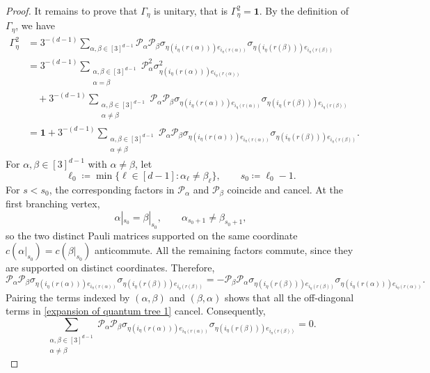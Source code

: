 \documentclass{amsbook}
\theoremstyle{definition}
\theoremstyle{remark}
\numberwithin{section}{chapter}
\numberwithin{equation}{chapter}
\newcommand{\1}{\mathbf{1}}
\begin{document}
\begin{proof}
It remains to prove that $\Gamma_{\eta}$ is unitary, that is $\Gamma_{\eta}^{2}=\mathbf{1}$. By the definition of $\Gamma_{\eta}$, we have
\begin{equation}\label{expansion of quantum tree 1}
\begin{split}
\Gamma_{\eta}^{2}&=3^{-(d-1)}\sum_{\alpha,\beta\in [3]^{d-1}}\mathcal{P}_{\alpha}\mathcal{P}_{\beta}\sigma_{\eta(i_{\eta}(r(\alpha)))e_{i_{\eta}(r(\alpha))}}\sigma_{\eta(i_{\eta}(r(\beta)))e_{i_{\eta}(r(\beta))}}\\
&=3^{-(d-1)}\sum_{\substack{\alpha, \beta\in [3]^{d-1}\\\alpha=\beta}}\mathcal{P}^{2}_{\alpha}\sigma^{2}_{\eta(i_{\eta}(r(\alpha)))e_{i_{\eta}(r(\alpha))}}\\
&\quad+3^{-(d-1)}\sum_{\substack{\alpha, \beta\in [3]^{d-1}\\\alpha\neq \beta}}\mathcal{P}_{\alpha}\mathcal{P}_{\beta}\sigma_{\eta(i_{\eta}(r(\alpha)))e_{i_{\eta}(r(\alpha))}}\sigma_{\eta(i_{\eta}(r(\beta)))e_{i_{\eta}(r(\beta))}}\\
&=\mathbf{1}+3^{-(d-1)}\sum_{\substack{\alpha, \beta\in [3]^{d-1}\\\alpha\neq \beta}}\mathcal{P}_{\alpha}\mathcal{P}_{\beta}\sigma_{\eta(i_{\eta}(r(\alpha)))e_{i_{\eta}(r(\alpha))}}\sigma_{\eta(i_{\eta}(r(\beta)))e_{i_{\eta}(r(\beta))}}.
\end{split}
\end{equation}
For $\alpha,\beta\in[3]^{d-1}$ with $\alpha\neq\beta$, let
\[
\ell_{0}\coloneqq\min\{\ell\in[d-1]:\alpha_{\ell}\neq\beta_{\ell}\},
\qquad
s_{0}\coloneqq\ell_{0}-1.
\]
For $s<s_{0}$, the corresponding factors in $\mathcal P_{\alpha}$ and
$\mathcal P_{\beta}$ coincide and cancel. At the first branching vertex,
\[
\alpha|_{s_{0}}=\beta|_{s_{0}},
\qquad
\alpha_{s_{0}+1}\neq\beta_{s_{0}+1},
\]
so the two distinct Pauli matrices supported on the same coordinate
$c(\alpha|_{s_{0}})=c(\beta|_{s_{0}})$ anticommute. All the remaining
factors commute, since they are supported on distinct coordinates.
Therefore,
\[
\mathcal{P}_{\alpha}\mathcal{P}_{\beta}\sigma_{\eta(i_{\eta}(r(\alpha)))e_{i_{\eta}(r(\alpha))}}\sigma_{\eta(i_{\eta}(r(\beta)))e_{i_{\eta}(r(\beta))}}=-\mathcal{P}_{\beta}\mathcal{P}_{\alpha}\sigma_{\eta(i_{\eta}(r(\beta)))e_{i_{\eta}(r(\beta))}}\sigma_{\eta(i_{\eta}(r(\alpha)))e_{i_{\eta}(r(\alpha))}}.
\]
Pairing the terms indexed by $(\alpha,\beta)$ and $(\beta,\alpha)$ shows
that all the off-diagonal terms in \eqref{expansion of quantum tree 1}
cancel. Consequently,
\[\sum_{\substack{\alpha, \beta\in [3]^{d-1}\\\alpha\neq \beta}}\mathcal{P}_{\alpha}\mathcal{P}_{\beta}\sigma_{\eta(i_{\eta}(r(\alpha)))e_{i_{\eta}(r(\alpha))}}\sigma_{\eta(i_{\eta}(r(\beta)))e_{i_{\eta}(r(\beta))}}=0.\]

\end{proof}
\end{document}
